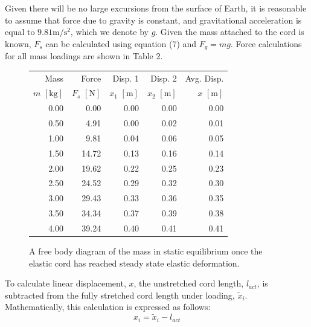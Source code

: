 \documentclass[a4paper]{article}
\begin{document}
Given there will be no large excursions from the surface of Earth, it is reasonable to assume that force due to gravity is constant, and gravitational acceleration is equal to $9.81\si{\meter\per\second^2}$, which we denote by $g$. Given the mass attached to the cord is known, $F_s$ can be calculated using equation (7) and $F_g = mg$. Force calculations for all mass loadings are shown in Table 2.

\begin{figure}[h]
	\begin{minipage}{0.40\textwidth}
		\centering
		\caption{A free body diagram of the mass in static equilibrium once the elastic cord has reached steady state elastic deformation.}
	\end{minipage}
	\hspace{0.5cm}
	\begin{minipage}{0.53\textwidth}
		\centering
		\begin{tabular}{rrrrr}
			\toprule
			Mass & Force & Disp.  1 & Disp.  2 & Avg. Disp. \\
			$m$ $[\si{\kilogram}]$ & $F_s$ $[\si{\newton}]$ & $x_1$ $[\si{\meter}]$ & $x_2$ $[\si{\meter}]$ & $x$ $[\si{\meter}]$ \\
			\midrule
			0.00 &  0.00 & 0.00 & 0.00 & 0.00\\
			0.50 &  4.91 & 0.00 & 0.02 & 0.01\\
			1.00 &  9.81 & 0.04 & 0.06 & 0.05\\
			1.50 & 14.72 & 0.13 & 0.16 & 0.14\\
			2.00 & 19.62 & 0.22 & 0.25 & 0.23\\
			2.50 & 24.52 & 0.29 & 0.32 & 0.30\\
			3.00 & 29.43 & 0.33 & 0.36 & 0.35\\
			3.50 & 34.34 & 0.37 & 0.39 & 0.38\\
			4.00 & 39.24 & 0.40 & 0.41 & 0.41\\
			\bottomrule
		\end{tabular}
	\end{minipage}
\end{figure}

To calculate linear displacement, $x$, the unstretched cord length, $l_{act}$, is subtracted from the fully stretched cord length under loading, $\tilde{x}_i$. Mathematically, this calculation is expressed as follows:
\begin{equation}
x_i = \tilde{x}_i - l_{act}
\end{equation}
\end{document}
